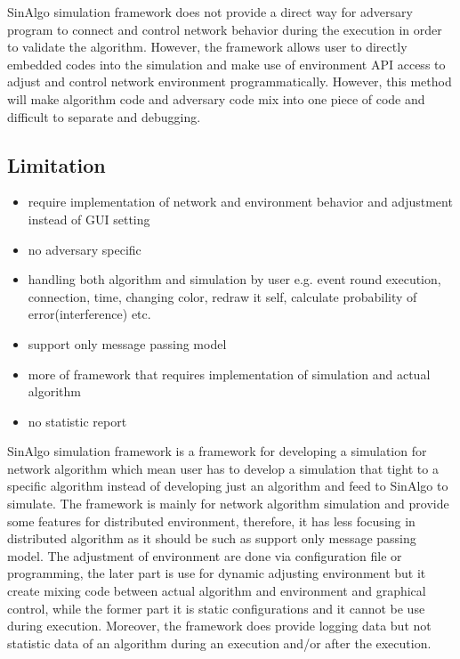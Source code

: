 SinAlgo simulation framework does not provide a direct way for adversary program to connect and control network behavior during the execution in order to validate the algorithm. However, the framework allows user to directly embedded codes into the simulation and make use of environment API access to adjust and control network environment programmatically. However, this method will make algorithm code and adversary code mix into one piece of code and difficult to separate and debugging.

\subsection*{Limitation}
\begin{itemize}
\item require implementation of network and environment behavior and adjustment instead of GUI setting
\item no adversary specific
\item handling both algorithm and simulation by user e.g. event round execution, connection, time, changing color, redraw it self, calculate probability of error(interference) etc.
\item support only message passing model
\item more of framework that requires implementation of simulation and actual algorithm
\item no statistic report
\end{itemize}

SinAlgo simulation framework is a framework for developing a simulation for network algorithm which mean user has to develop a simulation that tight to a specific algorithm instead of developing just an algorithm and feed to SinAlgo to simulate. The framework is mainly for network algorithm simulation and provide some features for distributed environment, therefore, it has less focusing in distributed algorithm as it should be such as support only message passing model. The adjustment of environment are done via configuration file or programming, the later part is use for dynamic adjusting environment but it create mixing code between actual algorithm and environment and graphical control, while the former part it is static configurations and it cannot be use during execution. Moreover, the framework does provide logging data but not statistic data of an algorithm during an execution and/or after the execution.











